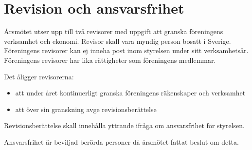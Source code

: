 \section{Revision och ansvarsfrihet}
Årsmötet utser upp till två revisorer med uppgift att granska föreningens verksamhet
och ekonomi. Revisor skall vara myndig person bosatt i Sverige. Föreningens revisorer
kan ej inneha post inom styrelsen under sitt verksamhetsår. Föreningens revisorer har
lika rättigheter som föreningens medlemmar.

Det åligger revisorerna:
\begin{itemize}
    \item att under året kontinuerligt granska föreningens räkenskaper och verksamhet
    \item att över sin granskning avge revisionsberättelse
\end{itemize}

Revisionsberättelse skall innehålla yttrande ifråga om ansvarsfrihet för styrelsen.

Ansvarsfrihet är beviljad berörda personer då årsmötet fattat beslut om detta.